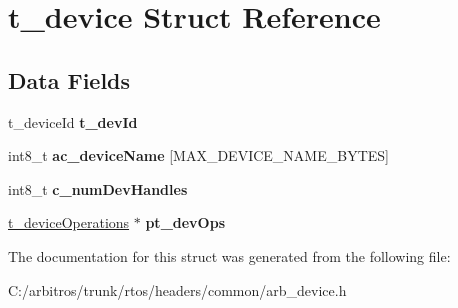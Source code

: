 \hypertarget{structt__device}{\section{t\-\_\-device Struct Reference}
\label{structt__device}
}
\subsection*{Data Fields}
\begin{DoxyCompactItemize}
\item 
\hypertarget{structt__device_a74f70bbd98091261a7b30808f07ccdd5}{t\-\_\-device\-Id {\bfseries t\-\_\-dev\-Id}}\label{structt__device_a74f70bbd98091261a7b30808f07ccdd5}

\item 
\hypertarget{structt__device_ad5f589905b569ab101984559869a4479}{int8\-\_\-t {\bfseries ac\-\_\-device\-Name} \mbox{[}M\-A\-X\-\_\-\-D\-E\-V\-I\-C\-E\-\_\-\-N\-A\-M\-E\-\_\-\-B\-Y\-T\-E\-S\mbox{]}}\label{structt__device_ad5f589905b569ab101984559869a4479}

\item 
\hypertarget{structt__device_acdad38f26daa29ea811e6107702f1222}{int8\-\_\-t {\bfseries c\-\_\-num\-Dev\-Handles}}\label{structt__device_acdad38f26daa29ea811e6107702f1222}

\item 
\hypertarget{structt__device_a6ecc95fd00e2577591ac693e90d3bb0a}{\hyperlink{structt__device_operations}{t\-\_\-device\-Operations} $\ast$ {\bfseries pt\-\_\-dev\-Ops}}\label{structt__device_a6ecc95fd00e2577591ac693e90d3bb0a}

\end{DoxyCompactItemize}


The documentation for this struct was generated from the following file\-:\begin{DoxyCompactItemize}
\item 
C\-:/arbitros/trunk/rtos/headers/common/arb\-\_\-device.\-h\end{DoxyCompactItemize}
